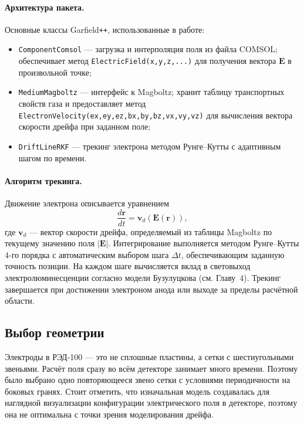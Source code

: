 \documentclass[12pt]{article}
\begin{document}
\paragraph{Архитектура пакета.}
Основные классы Garfield\texttt{++}, использованные в работе:
\begin{itemize}
  \item \texttt{ComponentComsol} --- загрузка и интерполяция поля из файла
        COMSOL; обеспечивает метод \texttt{ElectricField(x,y,z,...)} для
        получения вектора $\mathbf{E}$ в произвольной точке;
  \item \texttt{MediumMagboltz} --- интерфейс к Magboltz; хранит таблицу
        транспортных свойств газа и предоставляет метод
        \texttt{ElectronVelocity(ex,ey,ez,bx,by,bz,vx,vy,vz)} для
        вычисления вектора скорости дрейфа при заданном поле;
  \item \texttt{DriftLineRKF} --- трекинг электрона методом Рунге--Кутты
        с адаптивным шагом по времени.
\end{itemize}

\paragraph{Алгоритм трекинга.}
Движение электрона описывается уравнением
\begin{equation}
  \frac{d\mathbf{r}}{dt} = \mathbf{v}_d\!\left(\mathbf{E}(\mathbf{r})\right),
\end{equation}
где $\mathbf{v}_d$ --- вектор скорости дрейфа, определяемый из таблицы
Magboltz по текущему значению поля $|\mathbf{E}|$. Интегрирование
выполняется методом Рунге--Кутты 4-го порядка с автоматическим выбором
шага $\Delta t$, обеспечивающим заданную точность позиции. На каждом шаге
вычисляется вклад в световыход электролюминесценции согласно модели
Бузулуцкова (см. Главу~4). Трекинг завершается при достижении электроном
анода или выходе за пределы расчётной области.

\subsection{Выбор геометрии}

Электроды в РЭД-100 --- это не сплошные пластины, а сетки с шестиугольными
звеньями. Расчёт поля сразу во всём детекторе занимает много времени.
Поэтому было выбрано одно повторяющееся звено сетки с условиями
периодичности на боковых гранях. Стоит отметить, что изначальная модель создавалась для наглядной визуализации конфигурации электрического поля в детекторе, поэтому она не оптимальна с точки зрения моделирования дрейфа. 
\end{document}
